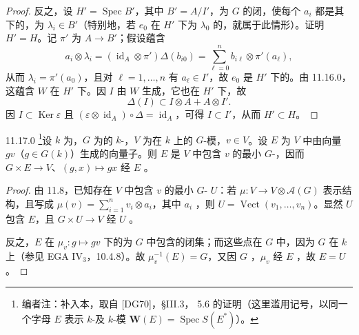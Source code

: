 \begin{proof}
反之，设 $H'=\operatorname{Spec}B'$，其中 $B'=A/I'$，为 $G$ 的闭，使每个 $a_i$ 都是其下的，为 $\lambda_i\in B'$（特别地，若 $e_0$ 在 $H'$ 下为 $\lambda_0$ 的，就属于此情形）。证明 $H'=H$。记 $\pi'$
为 $A\to B'$；假设蕴含
\[
a_i\otimes\lambda_i=(\operatorname{id}_A\otimes\pi')\Delta(b_{i0})
=\sum_{\ell=0}^n b_{i\ell}\otimes\pi'(a_\ell),
\]
从而 $\lambda_i=\pi'(a_0)$，且对 $\ell=1,\ldots,n$ 有 $a_\ell\in I'$，故 $e_0$ 是 $H'$ 下的。由 11.16.0，这蕴含 $W$ 在 $H'$ 下。因 $I$ 由 $W$ 生成，它也在 $H'$ 下，故
\[
\Delta(I)\subset I\otimes A+A\otimes I'.
\]
因 $I\subset\operatorname{Ker}\varepsilon$ 且 $(\varepsilon\otimes\operatorname{id}_A)\circ\Delta=\operatorname{id}_A$，可得 $I\subset I'$，从而 $H'\subset H$。
\end{proof}

\begin{SGAresult}{}{11.17.0}
\footnote{编者注：补入本，取自 [DG70]，§III.3， 5.6 的证明（这里滥用记号，以同一个字母 $E$ 表示 $k$-及 $k$-模 $\mathbf W(E)=\operatorname{Spec}S(E^*)$）。}设 $k$ 为，$G$ 为的 $k$-，$V$ 为在 $k$ 上的 $G$-模，$v\in V$。设 $E$ 为 $V$ 中由向量 $gv$（$g\in G(k)$）生成的向量子。则 $E$ 是 $V$ 中包含 $v$ 的最小 $G$-，因而 $G\times E\to V$、$(g,x)\mapsto gx$ 经 $E$ 。
\end{SGAresult}
\begin{proof}
由 11.8，已知存在 $V$ 中包含 $v$ 的最小 $G$- $U$：若 $\mu:V\to V\otimes\mathcal A(G)$ 表示结构，且写成 $\mu(v)=\sum_{i=1}^n v_i\otimes a_i$，其中 $a_i$ ，则 $U=\operatorname{Vect}(v_1,\ldots,v_n)$。显然 $U$ 包含 $E$，且 $G\times U\to V$ 经 $U$ 。

反之，$E$ 在 $\mu_v:g\mapsto gv$ 下的为 $G$ 中包含的闭集；而这些点在 $G$ 中，因为 $G$ 在 $k$ 上（参见 EGA IV$_3$，10.4.8）。故 $\mu_v^{-1}(E)=G$，又因 $G$ ，$\mu_v$ 经 $E$ ，故 $E=U$。
\end{proof}

